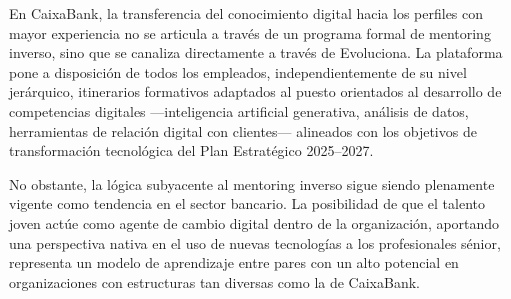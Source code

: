 En CaixaBank, la transferencia del conocimiento digital hacia los perfiles con mayor experiencia
no se articula a través de un programa formal de mentoring inverso, sino que se canaliza
directamente a través de Evoluciona. La plataforma pone a disposición de todos los empleados,
independientemente de su nivel jerárquico, itinerarios formativos adaptados al puesto orientados
al desarrollo de competencias digitales —inteligencia artificial generativa, análisis de datos,
herramientas de relación digital con clientes— alineados con los objetivos de transformación
tecnológica del Plan Estratégico 2025--2027.

No obstante, la lógica subyacente al mentoring inverso sigue siendo plenamente vigente como
tendencia en el sector bancario. La posibilidad de que el talento joven actúe como agente de
cambio digital dentro de la organización, aportando una perspectiva nativa en el uso de nuevas
tecnologías a los profesionales sénior, representa un modelo de aprendizaje entre pares con un
alto potencial en organizaciones con estructuras tan diversas como la de CaixaBank.
